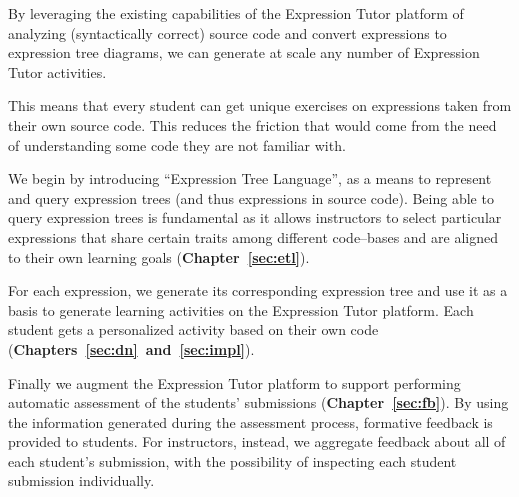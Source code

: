 \begin{chapterBody}
By leveraging the existing capabilities of the Expression Tutor platform of
analyzing (syntactically correct) source code and convert expressions to
expression tree diagrams, we can generate at scale any number of Expression
Tutor activities.

This means that every student can get unique exercises on expressions taken 
from their own source code. This reduces the friction that would come from the
need of understanding some code they are not familiar with.

We begin by introducing ``Expression Tree Language'', as a means to represent and
query expression trees (and thus expressions in source code). Being able
to query expression trees is fundamental as it allows instructors to select 
particular expressions that share certain traits among different code–bases and 
are aligned to their own learning goals (\textbf{Chapter~\ref{sec:etl}}).

For each expression, we generate its corresponding expression tree and
use it as a basis to generate learning activities on the Expression Tutor
platform. Each student gets a personalized activity based on their own
code (\textbf{Chapters~\ref{sec:dn}~and~\ref{sec:impl}}).

Finally we augment the Expression Tutor platform to support performing
automatic assessment of the students' submissions (\textbf{Chapter~\ref{sec:fb}}).
By using the information generated during the assessment process, formative
feedback is provided to students. For instructors, instead, we aggregate feedback
about all of each student's submission, with the possibility of inspecting each
student submission individually.

\end{chapterBody}
